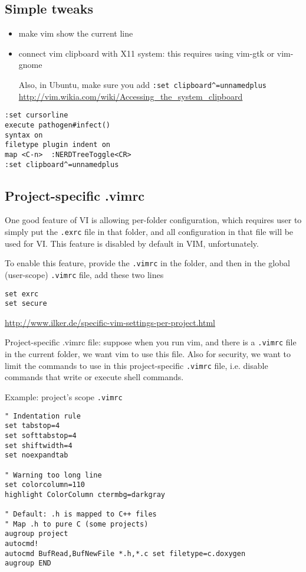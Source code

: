 \subsection{Simple tweaks}


\begin{itemize}
  \item make vim show the current line
  \item connect vim clipboard with X11 system: this requires using vim-gtk or
  vim-gnome
  
  Also, in Ubuntu, make sure you add \verb!:set clipboard^=unnamedplus!
  \url{http://vim.wikia.com/wiki/Accessing_the_system_clipboard}

\end{itemize}


\begin{verbatim}
:set cursorline 
execute pathogen#infect()
syntax on
filetype plugin indent on
map <C-n>  :NERDTreeToggle<CR>
:set clipboard^=unnamedplus
\end{verbatim}

\subsection{Project-specific .vimrc}

One good feature of VI is allowing per-folder configuration, which requires user
to simply put the \verb!.exrc! file in that folder, and all configuration in
that file will be used for VI.
This feature is disabled by default in VIM, unfortunately.

To enable this feature, provide the \verb!.vimrc! in the folder, and then in the
global (user-scope) \verb!.vimrc! file, add  these two lines 
\begin{verbatim}
set exrc
set secure
\end{verbatim}
\url{http://www.ilker.de/specific-vim-settings-per-project.html}

Project-specific .vimrc file: suppose when you run vim, and there is a
\verb!.vimrc! file in the current folder, we want vim to use this file.
Also for security, we want to limit the commands to use in this project-specific
\verb!.vimrc! file, i.e. disable commands that write or execute shell commands.


Example: project's scope \verb!.vimrc!
\begin{verbatim}
" Indentation rule
set tabstop=4
set softtabstop=4
set shiftwidth=4
set noexpandtab

" Warning too long line
set colorcolumn=110
highlight ColorColumn ctermbg=darkgray

" Default: .h is mapped to C++ files
" Map .h to pure C (some projects)
augroup project
autocmd!
autocmd BufRead,BufNewFile *.h,*.c set filetype=c.doxygen
augroup END
\end{verbatim}

